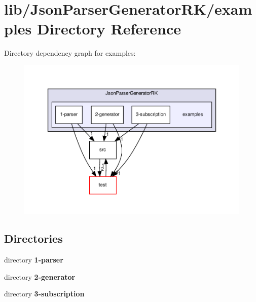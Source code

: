 \section{lib/\+Json\+Parser\+Generator\+R\+K/examples Directory Reference}
\label{dir_2db5f4dc90982345ecd91c84524dc335}
Directory dependency graph for examples\+:\nopagebreak
\begin{figure}[H]
\begin{center}
\leavevmode
\includegraphics[width=350pt]{dir_2db5f4dc90982345ecd91c84524dc335_dep}
\end{center}
\end{figure}
\subsection*{Directories}
\begin{DoxyCompactItemize}
\item 
directory \textbf{ 1-\/parser}
\item 
directory \textbf{ 2-\/generator}
\item 
directory \textbf{ 3-\/subscription}
\end{DoxyCompactItemize}

